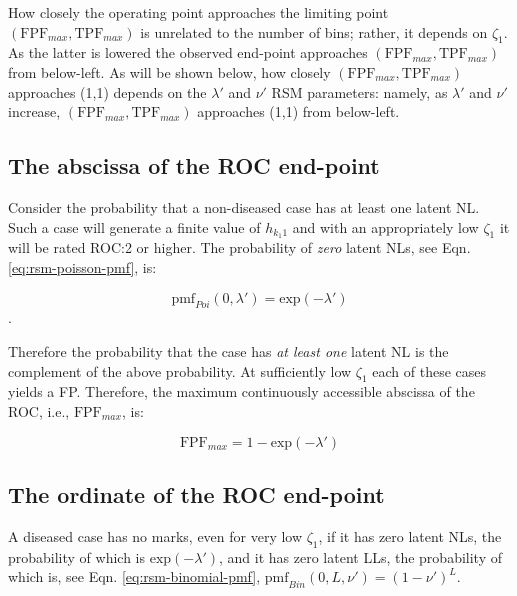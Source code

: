 \documentclass[
]{book}
\begin{document}
How closely the operating point approaches the limiting point \(\left (\text{FPF}_{max}, \text{TPF}_{max} \right )\) is unrelated to the number of bins; rather, it depends on \(\zeta_1\). As the latter is lowered the observed end-point approaches \(\left (\text{FPF}_{max}, \text{TPF}_{max} \right )\) from below-left. As will be shown below, how closely \(\left (\text{FPF}_{max}, \text{TPF}_{max} \right )\) approaches (1,1) depends on the \(\lambda'\) and \(\nu'\) RSM parameters: namely, as \(\lambda'\) and \(\nu'\) increase, \(\left (\text{FPF}_{max}, \text{TPF}_{max} \right )\) approaches (1,1) from below-left.

\hypertarget{rsm-pred-constrained-end-point-abscissa}{%
\subsection{The abscissa of the ROC end-point}\label{rsm-pred-constrained-end-point-abscissa}}

Consider the probability that a non-diseased case has at least one latent NL. Such a case will generate a finite value of \(h_{k_1 1}\) and with an appropriately low \(\zeta_1\) it will be rated ROC:2 or higher. The probability of \emph{zero} latent NLs, see Eqn. \eqref{eq:rsm-poisson-pmf}, is:

\[\text{pmf}_{Poi} \left (0,\lambda' \right ) = \text{exp} \left ( -\lambda' \right )\].

Therefore the probability that the case has \emph{at least one} latent NL is the complement of the above probability. At sufficiently low \(\zeta_1\) each of these cases yields a FP. Therefore, the maximum continuously accessible abscissa of the ROC, i.e., \(\text{FPF}_{max}\), is:

\begin{equation} 
\text{FPF}_{max} = 1 - \text{exp} \left ( -\lambda' \right )
\label{eq:rsm-pred-fpf-max}
\end{equation}

\hypertarget{rsm-pred-constrained-end-point-ordinate}{%
\subsection{The ordinate of the ROC end-point}\label{rsm-pred-constrained-end-point-ordinate}}

A diseased case has no marks, even for very low \(\zeta_1\), if it has zero latent NLs, the probability of which is \(\text{exp}(-\lambda')\), and it has zero latent LLs, the probability of which is, see Eqn. \eqref{eq:rsm-binomial-pmf}, \(\text{pmf}_{Bin} \left ( 0, L, \nu' \right )= (1 - \nu')^L\).
\end{document}
